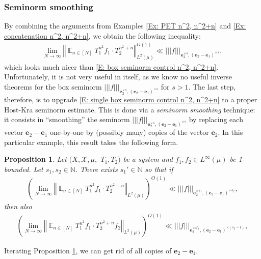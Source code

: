 \documentclass[11pt]{amsart}
\newtheorem{proposition}[lemma]{Proposition}
\theoremstyle{definition}
\DeclareMathOperator*{\E}{\mathbb{E}}
\newcommand{\N}{{\mathbb N}}
\newcommand{\CX}{{\mathcal X}}
\newcommand{\be}{{\mathbf{e}}}
\newcommand{\norm}[1]{\left\Vert #1\right\Vert}
\newcommand{\nnorm}[1]{\lvert\!|\!| #1|\!|\!\rvert}
\newcommand{\1}{{\mathbf{1}}}
\newcommand{\brac}[1]{\mathopen{}\left( #1 \mathclose{}\right)}
\begin{document}
\subsubsection{Seminorm smoothing}
By combining the arguments from Examples \ref{Ex: PET n^2, n^2+n} and \ref{Ex: concatenation n^2, n^2+n}, we obtain the following inequality:
\begin{align}\label{E: single box seminorm control n^2, n^2+n}
    \lim_{N\to\infty}\norm{\E_{n\in[N]}T_1^{n^2}f_1\cdot T_2^{n^2+n}}_{L^2(\mu)}^{O(1)}\ll \nnorm{f}_{\be_2^{\times s}, (\be_2-\be_1)^{\times s}},
\end{align}
which looks much nicer than \eqref{E: box seminorm control n^2, n^2+n}. Unfortunately, it is not very useful in itself, as we know no useful inverse theorems for the box seminorm $\nnorm{f}_{\be_2^{\times s}, (\be_2-\be_1)^{\times s}}$ for $s>1$. The last step, therefore, is to upgrade \eqref{E: single box seminorm control n^2, n^2+n} to a proper Host-Kra seminorm estimate. This is done via a \emph{seminorm smoothing} technique: it consists in ``smoothing'' the seminorm $\nnorm{f}_{\be_2^{\times s}, (\be_2-\be_1)^{\times s}}$ by replacing each vector $\be_2-\be_1$ one-by-one by (possibly many) copies of the vector $\be_2$. In this particular example, this result takes the following form.
\begin{proposition}\label{P: smoothing}
    Let $(X, \CX, \mu,$\! $T_1, T_2)$ be a system and $f_1, f_2\in L^\infty(\mu)$ be 1-bounded. Let $s_1, s_2\in\N$. There exists $s_1'\in\N$ so that if 
    \begin{align*}
        \brac{\lim_{N\to\infty}\norm{\E_{n\in[N]}T_1^{n^2}f_1\cdot T_2^{n^2+n}}_{L^2(\mu)}}^{O(1)}\ll \nnorm{f}_{\be_2^{\times s_1}, (\be_2-\be_1)^{\times s_2}},
    \end{align*}
    then also
    \begin{align*}
        \brac{\lim_{N\to\infty}\norm{\E_{n\in[N]}T_1^{n^2}f_1\cdot T_2^{n^2+n}f_2}_{L^2(\mu)}}^{O(1)}\ll \nnorm{f}_{\be_2^{\times s'_1}, (\be_2-\be_1)^{\times (s_2-1)}},
    \end{align*}
\end{proposition}
Iterating Proposition \ref{P: smoothing}, we can get rid of all copies of $\be_2-\be_1$. 
\end{document}

